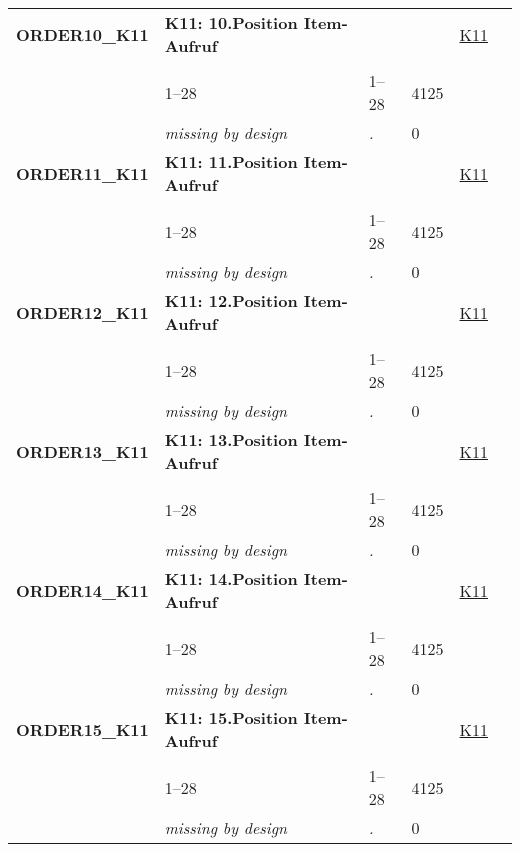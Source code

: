 \begin{longtable}{| L{2.45cm} | L{6cm} | C{1.5cm} | R{1cm} | C{2.25cm} | C{2.25cm} |}
   \midrule
\textbf{ORDER10\_K11}\label{var:ORDER10:K11} & \textbf{K11: 10.Position Item-Aufruf} &  &  & \hyperref[K11]{K11} & \hyperref[var:suf:]{} \\ 
   &  &  &  &  &  \\ 
   & 1--28 & 1--28 & 4125 &  &  \\ 
   & \textit{missing by design} & \textit{.} & 0 &  &  \\ 
   \midrule
\textbf{ORDER11\_K11}\label{var:ORDER11:K11} & \textbf{K11: 11.Position Item-Aufruf} &  &  & \hyperref[K11]{K11} & \hyperref[var:suf:]{} \\ 
   &  &  &  &  &  \\ 
   & 1--28 & 1--28 & 4125 &  &  \\ 
   & \textit{missing by design} & \textit{.} & 0 &  &  \\ 
   \midrule
\textbf{ORDER12\_K11}\label{var:ORDER12:K11} & \textbf{K11: 12.Position Item-Aufruf} &  &  & \hyperref[K11]{K11} & \hyperref[var:suf:]{} \\ 
   &  &  &  &  &  \\ 
   & 1--28 & 1--28 & 4125 &  &  \\ 
   & \textit{missing by design} & \textit{.} & 0 &  &  \\ 
   \midrule
\textbf{ORDER13\_K11}\label{var:ORDER13:K11} & \textbf{K11: 13.Position Item-Aufruf} &  &  & \hyperref[K11]{K11} & \hyperref[var:suf:]{} \\ 
   &  &  &  &  &  \\ 
   & 1--28 & 1--28 & 4125 &  &  \\ 
   & \textit{missing by design} & \textit{.} & 0 &  &  \\ 
   \midrule
\textbf{ORDER14\_K11}\label{var:ORDER14:K11} & \textbf{K11: 14.Position Item-Aufruf} &  &  & \hyperref[K11]{K11} & \hyperref[var:suf:]{} \\ 
   &  &  &  &  &  \\ 
   & 1--28 & 1--28 & 4125 &  &  \\ 
   & \textit{missing by design} & \textit{.} & 0 &  &  \\ 
   \midrule
\textbf{ORDER15\_K11}\label{var:ORDER15:K11} & \textbf{K11: 15.Position Item-Aufruf} &  &  & \hyperref[K11]{K11} & \hyperref[var:suf:]{} \\ 
   &  &  &  &  &  \\ 
   & 1--28 & 1--28 & 4125 &  &  \\ 
   & \textit{missing by design} & \textit{.} & 0 &  &  \\ 

\end{longtable}
